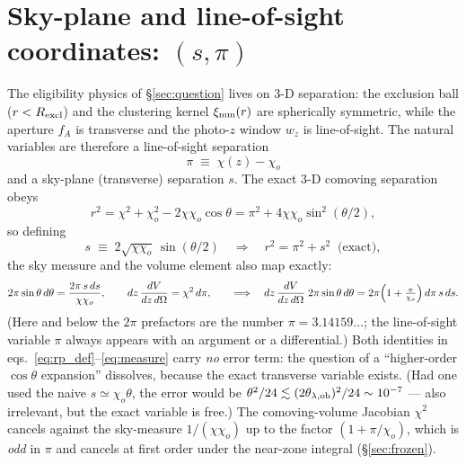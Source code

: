 \documentclass[a4paper, 11pt]{article}
\newcommand{\ximm}{\xi_{\rm mm}}
\newcommand{\Rex}{R_{\rm excl}}
\newcommand{\rp}{s}
\newcommand{\thob}{\theta_{\lambda,{\rm ob}}}
\begin{document}
\section{Sky-plane and line-of-sight coordinates: \texorpdfstring{$(\rp,\pi)$}{(s, pi)}}
\label{sec:coords}

The eligibility physics of \S\ref{sec:question} lives on 3-D
separation: the exclusion ball ($r<\Rex$) and the clustering
kernel $\ximm(r)$ are spherically symmetric, while the aperture
$f_A$ is transverse and the photo-$z$ window $w_z$ is
line-of-sight. The natural variables are therefore a
line-of-sight separation
\begin{equation}
\pi \;\equiv\; \chi(z)-\chi_o
\end{equation}
and a sky-plane (transverse) separation $\rp$. The exact 3-D
comoving separation obeys
\begin{equation}
r^2
= \chi^2 + \chi_o^2 - 2\chi\chi_o\cos\theta
= \pi^2 + 4\chi\chi_o\sin^2(\theta/2),
\label{eq:exact_sep}
\end{equation}
so defining
\begin{equation}
\boxed{\;
\rp \;\equiv\; 2\sqrt{\chi\chi_o}\,\sin(\theta/2)
\quad\Longrightarrow\quad
r^2 = \pi^2 + \rp^2 \;\;\text{(exact)},
\;}
\label{eq:rp_def}
\end{equation}
the sky measure and the volume element also map exactly:
\begin{equation}
2\pi_{\vphantom{o}}\sin\theta\,d\theta
= \frac{2\pi_{\vphantom{o}}\,\rp\,d\rp}{\chi\chi_o},
\qquad
dz\,\frac{dV}{dz\,d\Omega} = \chi^2\,d\pi,
\qquad
\Longrightarrow\quad
dz\,\frac{dV}{dz\,d\Omega}\;2\pi\sin\theta\,d\theta
= 2\pi\Big(1+\tfrac{\pi}{\chi_o}\Big)\,d\pi\,\rp\,d\rp.
\label{eq:measure}
\end{equation}
(Here and below the $2\pi$ prefactors are the number
$\pi=3.14159\ldots$; the line-of-sight variable $\pi$ always
appears with an argument or a differential.)
Both identities in
eqs.~\eqref{eq:rp_def}--\eqref{eq:measure} carry \emph{no} error
term: the question of a ``higher-order $\cos\theta$ expansion''
dissolves, because the exact transverse variable exists. (Had one
used the naive $\rp\simeq\chi_o\theta$, the error would be
$\theta^2/24 \lesssim (2\thob)^2/24 \sim 10^{-7}$ --- also
irrelevant, but the exact variable is free.) The comoving-volume
Jacobian $\chi^2$ cancels against the sky-measure $1/(\chi\chi_o)$
up to the factor $(1+\pi/\chi_o)$, which is \emph{odd} in $\pi$
and cancels at first order under the near-zone integral
(\S\ref{sec:frozen}).
\end{document}
